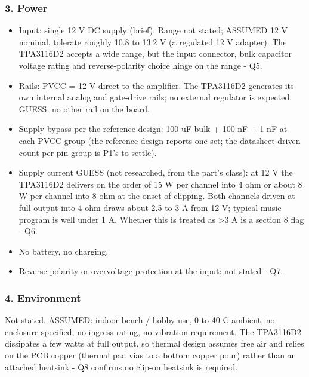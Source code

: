 \documentclass[11pt,a4paper]{article}
\begin{document}
\subsubsection*{3. Power}
\begin{itemize}
\item Input: single 12 V DC supply (brief). Range not stated; ASSUMED 12 V nominal, tolerate roughly
10.8 to 13.2 V (a regulated 12 V adapter). The TPA3116D2 accepts a wide range, but the input
connector, bulk capacitor voltage rating and reverse-polarity choice hinge on the range - Q5.
\item Rails: PVCC = 12 V direct to the amplifier. The TPA3116D2 generates its own internal analog and
gate-drive rails; no external regulator is expected. GUESS: no other rail on the board.
\item Supply bypass per the reference design: 100 uF bulk + 100 nF + 1 nF at each PVCC group (the reference design reports one set;
the datasheet-driven count per pin group is P1's to settle).
\item Supply current GUESS (not researched, from the part's class): at 12 V the TPA3116D2 delivers on
the order of 15 W per channel into 4 ohm or about 8 W per channel into 8 ohm at the onset of
clipping. Both channels driven at full output into 4 ohm draws about 2.5 to 3 A from 12 V;
typical music program is well under 1 A. Whether this is treated as \textgreater{}3 A is a section 8 flag - Q6.
\item No battery, no charging.
\item Reverse-polarity or overvoltage protection at the input: not stated - Q7.
\end{itemize}
\subsubsection*{4. Environment}
Not stated. ASSUMED: indoor bench / hobby use, 0 to 40 C ambient, no enclosure specified, no ingress rating, no vibration requirement. The TPA3116D2 dissipates a few watts at full output, so thermal design assumes free air and relies on the PCB copper (thermal pad vias to a bottom copper pour) rather than an attached heatsink - Q8 confirms no clip-on heatsink is required.
\end{document}
